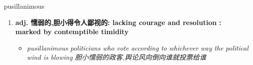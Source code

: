 
\begin{frame}
{\huge pusillanimous}
\begin{center}
\begin{enumerate}\Large
  \item \textbf{adj. 懦弱的,胆小得令人鄙视的: lacking courage and resolution : marked by contemptible timidity}
  \begin{itemize}
    \item \em{\Large{pusillanimous politicians who vote according to whichever way the political wind is blowing 胆小懦弱的政客,舆论风向倒向谁就投票给谁}}
  \end{itemize}
\end{enumerate}
\end{center}
\end{frame}
